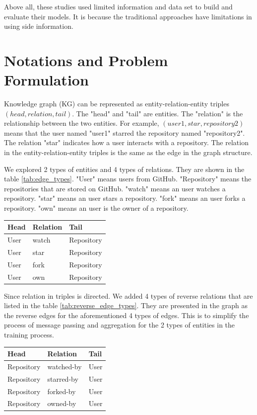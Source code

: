 \documentclass[11pt,twoside]{report}
\begin{document}
Above all, these studies used limited information and data set to build and evaluate their models. It is because the traditional approaches have limitations in using side information.

\chapter{Notations and Problem Formulation}
Knowledge graph (KG) can be represented as entity-relation-entity triples $(head, relation, tail)$. The "head" and "tail" are entities. The "relation" is the relationship between the two entities. For example, $(user1, star, repository2)$ means that the user named "user1" starred the repository named "repository2". The relation "star" indicates how a user interacts with a repository. The relation in the entity-relation-entity triples is the same as the edge in the graph structure.

We explored 2 types of entities and 4 types of relations. They are shown in the table \ref{tab:edge_types}. "User" means users from GitHub. "Repository" means the repositories that are stored on GitHub. "watch" means an user watches a repository. "star" means an user stars a repository. "fork" means an user forks a repository. "own" means an user is the owner of a repository. 

\begin{center}
    \begin{tabular}{l | l | l}
    \hline
    Head & Relation & Tail \\
    \hline
    User & watch & Repository \\
    User & star & Repository \\
    User & fork & Repository \\
    User & own & Repository \\
    \end{tabular}
    \label{tab:edge_types}
\end{center}

Since relation in triples is directed. We added 4 types of reverse relations that are listed in the table \ref{tab:reverse_edge_types}. They are presented in the graph as the reverse edges for the aforementioned 4 types of edges. This is to simplify the process of message passing and aggregation for the 2 types of entities in the training process.

\begin{center}
    \begin{tabular}{l | l | l}
    \hline
    Head & Relation & Tail \\
    \hline
    Repository & watched-by & User \\
    Repository & starred-by & User \\
    Repository & forked-by & User \\
    Repository & owned-by & User \\
    \end{tabular}
    \label{tab:reverse_edge_types}
\end{center}
\end{document}
